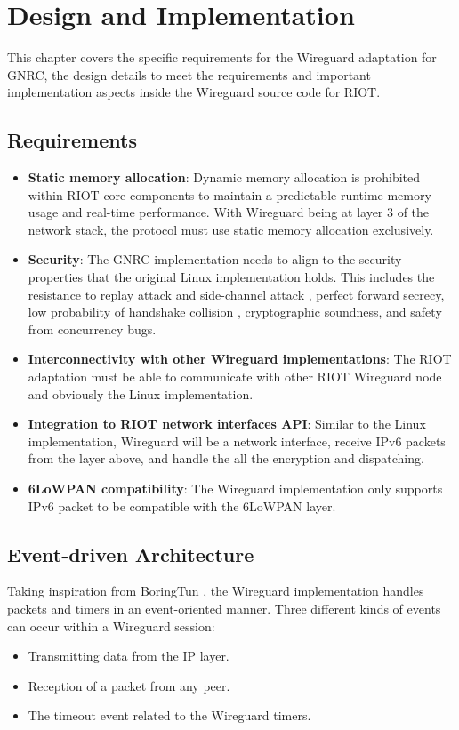 \chapter{Design and Implementation} \label{chap:des}
This chapter covers the specific requirements for the Wireguard adaptation for GNRC, the design 
details to meet the requirements and important implementation aspects inside the Wireguard source
code for RIOT.
\section{Requirements}
  \begin{itemize}
    \item \textbf{Static memory allocation}: Dynamic memory allocation is prohibited within RIOT core 
    components to maintain a predictable runtime memory usage and real-time performance. With
    Wireguard being at layer 3 of the network stack, the protocol must use static memory
    allocation exclusively.
    \item \textbf{Security}: The GNRC implementation needs to align to the security properties that
    the original Linux implementation holds. This includes the resistance to replay attack and
    side-channel attack \cite{side}, perfect forward secrecy, low probability of handshake collision \cite{pwu},
    cryptographic soundness, and safety from concurrency bugs.
    \item \textbf{Interconnectivity with other Wireguard implementations}: The RIOT adaptation must 
    be able to communicate with other RIOT Wireguard node and obviously the Linux implementation.
    \item \textbf{Integration to RIOT network interfaces API}: Similar to the Linux implementation,
    Wireguard will be a network interface, receive IPv6 packets from the layer above, and
    handle the all the encryption and dispatching.
    \item \textbf{6LoWPAN compatibility}: The Wireguard implementation only supports IPv6 packet
    to be compatible with the 6LoWPAN layer.
  \end{itemize}
\section{Event-driven Architecture}
  Taking inspiration from BoringTun \cite{boringtun}, the Wireguard implementation handles
  packets and timers in an event-oriented manner. Three different kinds of events can occur within
  a Wireguard session:
  \begin{itemize}
    \item Transmitting data from the IP layer.
    \item Reception of a packet from any peer.
    \item The timeout event related to the Wireguard timers.
  \end{itemize}

